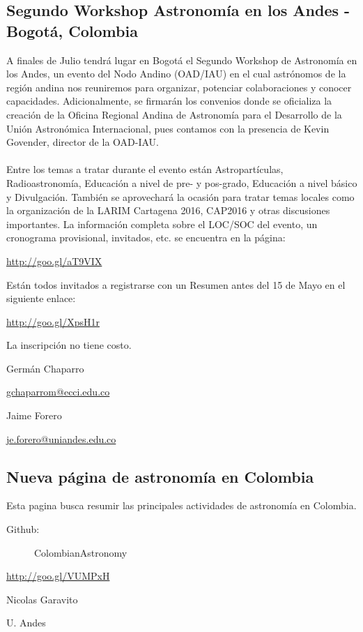 \documentclass{book}
\begin{document}
\subsection{Segundo Workshop Astronomía en los Andes - Bogotá, Colombia}


A finales de Julio tendrá lugar en Bogotá el Segundo Workshop de Astronomía en los Andes, un evento del Nodo Andino (OAD/IAU) en el cual astrónomos de la región andina nos reuniremos para organizar, potenciar colaboraciones y conocer capacidades. Adicionalmente, se firmarán los convenios donde se oficializa la creación de la Oficina Regional Andina de Astronomía para el Desarrollo de la Unión Astronómica Internacional, pues contamos con la presencia de Kevin Govender, director de la OAD-IAU. \\
\\
Entre los temas a tratar durante el evento están Astropartículas, Radioastronomía, Educación a nivel de pre- y pos-grado, Educación a nivel básico y Divulgación. También se aprovechará la ocasión para tratar temas locales como la organización de la LARIM Cartagena 2016, CAP2016 y otras discusiones importantes. La información completa sobre el LOC/SOC del evento, un cronograma provisional, invitados, etc. se encuentra en la página:
\begin{center}
\url{http://goo.gl/aT9VIX}
\end{center}
Están todos invitados a registrarse con un Resumen antes del 15 de Mayo en el siguiente enlace:
\begin{center}
\url{http://goo.gl/XpsH1r}
\end{center}
La inscripción no tiene costo.

\begin{flushright}
Germán Chaparro 

\url{gchaparrom@ecci.edu.co}

Jaime Forero 

\url{je.forero@uniandes.edu.co}
\end{flushright}
\subsection{Nueva página de astronomía en Colombia}
Esta pagina busca resumir las principales actividades de astronomía en Colombia. 
 
 \begin{description}
 \item[Github: ]ColombianAstronomy
 \end{description}
\begin{center}
\url{http://goo.gl/VUMPxH}
\end{center}
\begin{flushright}
Nicolas Garavito

U. Andes
\end{flushright}
\newpage
\end{document}
